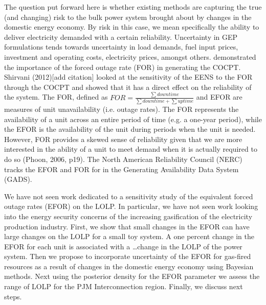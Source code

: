 \documentclass[10pt]{amsart}
\begin{document}
	The question put forward here is whether existing methods are capturing the true (and changing) risk to the bulk power system brought about by changes in the domestic energy economy. 
	By risk in this case, we mean specifically the ability to deliver electricity demanded with a certain reliability. 
	Uncertainty in GEP formulations tends towards uncertainty in load demands, fuel input prices, investment and operating costs, electricity prices, amongst others.
	\parencite{} demonstrated the importance of the forced outage rate (FOR) in generating the COCPT. 
	Shirvani (2012)[add citation] looked at the sensitivity of the EENS to the FOR through the COCPT and showed that it has a direct effect on the reliability of the system. 
	The FOR, defined as $FOR = \frac{\sum down time}{\sum down time + \sum up time}$ and EFOR are measures of unit unavailability (i.e. outage rates). 
	The FOR represents the availability of a unit across an entire period of time (e.g. a one-year period), while the EFOR is the availability of the unit during periods when the unit is needed.
	However, FOR provides a skewed sense of reliability given that we are more interested in the ability of a unit to meet demand when it is actually required to do so (Phoon, 2006, p19).  
	The North American Reliability Council (NERC) tracks the EFOR and FOR for in the Generating Availability Data System (GADS).
	
	We have not seen work dedicated to a sensitivity study of the equivalent forced outage rates (EFOR) on the LOLP.
	In particular, we have not seen work looking into the energy security concerns of the increasing gasification of the electricity production industry.
	First, we show that small changes in the EFOR can have large changes on the LOLP for a small toy system.
	A one percent change in the EFOR for each unit is associated with a \ldots change in the LOLP of the power system.
	Then we propose to incorporate uncertainty of the EFOR for gas-fired resources as a result of changes in the domestic energy economy using Bayesian methods.
	Next using the posterior density for the EFOR parameter we assess the range of LOLP for the PJM Interconnection region. 
	Finally, we discuss next steps. 
		
\end{document}
